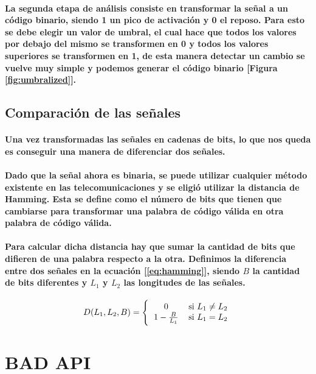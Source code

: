 \documentclass{article}
\begin{document}
\paragraph{
La segunda etapa de análisis consiste en transformar la señal a un código binario, siendo 1 un pico de activación y 0 el reposo. Para esto se debe elegir un valor de umbral, el cual hace que todos los valores por debajo del mismo se transformen en 0 y todos los valores superiores se transformen en 1, de esta manera detectar un cambio se vuelve muy simple y podemos generar el código binario [Figura \ref{fig:umbralized}].
}
\subsection{Comparación de las señales}
\paragraph{
Una vez transformadas las señales en cadenas de bits, lo que nos queda es conseguir una manera de diferenciar dos señales.
}
\paragraph{
Dado que la señal ahora es binaria, se puede utilizar cualquier método existente en las telecomunicaciones y se eligió utilizar la distancia de Hamming. Esta se define como el número de bits que tienen que cambiarse para transformar una palabra de código válida en otra palabra de código válida.
}
\paragraph{
Para calcular dicha distancia hay que sumar la cantidad de bits que difieren de una palabra respecto a la otra. Definimos la diferencia entre dos señales en la ecuación [\ref{eq:hamming}], siendo $B$ la cantidad de bits diferentes y $L_{1}$ y $L_{2}$ las longitudes de las señales.
}

\begin{equation}\label{eq:hamming}
D(L_1, L_2, B) =
\Bigg\{
  \begin{tabular}{ c c }
  $ 0 $ & si $L_1 \neq L_2$ \\
  $1 - \frac{B}{L_1}$ & si $L_1 = L_2$
  \end{tabular}
\end{equation}

\section{BAD API}
\end{document}
